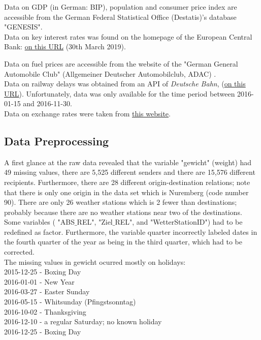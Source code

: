 \documentclass[a4paper, 11pt]{article}
\begin{document}
Data on GDP (in German: BIP), population and consumer price index are accessible from the German Federal Statistical Office (Destatis)'s database "GENESIS".\\
Data on key interest rates was found on the homepage of the European Central Bank: \href{http://sdw.ecb.europa.eu/quickview.do?SERIES_KEY=143.FM.D.U2.EUR.4F.KR.DFR.LEV&start=01-01-2015&end=31-12-2016&submitOptions.x=0&submitOptions.y=0&trans=N}{on this URL} (30th March 2019).

Data on fuel prices are accessible from the website of the "German General Automobile Club" (Allgemeiner Deutscher Automobilclub, ADAC) \citep{ADAC.}.\\

Data on railway delays was obtained from an API of \textit{Deutsche Bahn}, (\href{http://data.deutschebahn.com/dataset/ist-verkehrsdaten-der-db-cargo-auf-bst8-ebene}{on this URL}). Unfortunately, data was only available for the time period between 2016-01-15 and 2016-11-30.\\

Data on exchange rates were taken from \href{https://www.finanzen.net/devisen/dollarkurs/historisch}{this website}.

\subsection{Data Preprocessing}

A first glance at the raw data revealed that the variable "gewicht" (weight) had 49 missing values, there are 5,525 different senders and there are 15,576 different recipients. Furthermore, there are 28 different origin-destination relations; note that there is only one origin in the data set which is Nuremberg (code number 90). There are only 26 weather stations which is 2 fewer than destinations; probably because there are no weather stations near two of the destinations.
Some variables ( "ABS$\_$REL", "Ziel$\_$REL", and "WetterStationID") had to be redefined as factor. Furthermore, the variable quarter incorrectly labeled dates in the fourth quarter of the year as being in the third quarter, which had to be corrected. \\
The missing values in gewicht ocurred mostly on holidays:\\
2015-12-25 - Boxing Day\\
2016-01-01 - New Year\\
2016-03-27 - Easter Sunday\\
2016-05-15 - Whitsunday (Pfingstsonntag)\\
2016-10-02 - Thanksgiving\\
2016-12-10 - a regular Saturday; no known holiday\\
2016-12-25 - Boxing Day \\
\end{document}
